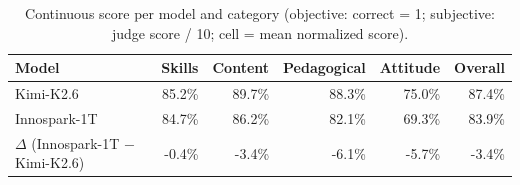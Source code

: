 \begin{table}[H]
  \centering
  \begin{tabular}{l r r r r r}
    \toprule
    \textbf{Model} & \textbf{Skills} & \textbf{Content} & \textbf{Pedagogical} & \textbf{Attitude} & \textbf{Overall} \\
    \midrule
    Kimi-K2.6 & 85.2\% & 89.7\% & 88.3\% & 75.0\% & 87.4\% \\
    Innospark-1T & 84.7\% & 86.2\% & 82.1\% & 69.3\% & 83.9\% \\
    \midrule
    $\Delta$ (Innospark-1T $-$ Kimi-K2.6) & -0.4\% & -3.4\% & -6.1\% & -5.7\% & -3.4\% \\
    \bottomrule
  \end{tabular}
  \caption{Continuous score per model and category (objective: correct = 1; subjective: judge score / 10; cell = mean normalized score).}
  \label{tab:praxis_reading}
\end{table}